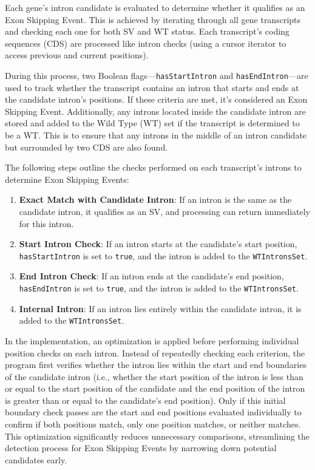 \documentclass{article}
\begin{document}
    Each gene's intron candidate is evaluated to determine whether it qualifies as an Exon Skipping Event. This is achieved by iterating through all gene transcripts and checking each one for both SV and WT status. Each transcript’s coding sequences (CDS) are processed like intron checks (using a cursor iterator to access previous and current positions).

    During this process, two Boolean flags—\texttt{hasStartIntron} and \texttt{hasEndIntron}—are used to track whether the transcript contains an intron that starts and ends at the candidate intron’s positions. If these criteria are met, it’s considered an Exon Skipping Event. Additionally, any introns located inside the candidate intron are stored and added to the Wild Type (WT) set if the transcript is determined to be a WT. This is to ensure that any introns in the middle of an intron candidate but surrounded by two CDS are also found.

    The following steps outline the checks performed on each transcript’s introns to determine Exon Skipping Events:

    \begin{enumerate}
        \item \textbf{Exact Match with Candidate Intron}: If an intron is the same as the candidate intron, it qualifies as an SV, and processing can return immediately for this intron.
        \item \textbf{Start Intron Check}: If an intron starts at the candidate’s start position, \texttt{hasStartIntron} is set to \texttt{true}, and the intron is added to the \texttt{WTIntronsSet}.
        \item \textbf{End Intron Check}: If an intron ends at the candidate’s end position, \texttt{hasEndIntron} is set to \texttt{true}, and the intron is added to the \texttt{WTIntronsSet}.
        \item \textbf{Internal Intron}: If an intron lies entirely within the candidate intron, it is added to the \texttt{WTIntronsSet}.
    \end{enumerate}
    In the implementation, an optimization is applied before performing individual position checks on each intron. Instead of repeatedly checking each criterion, the program first verifies whether the intron lies within the start and end boundaries of the candidate intron (i.e., whether the start position of the intron is less than or equal to the start position of the candidate and the end position of the intron is greater than or equal to the candidate’s end position). Only if this initial boundary check passes are the start and end positions evaluated individually to confirm if both positions match, only one position matches, or neither matches. This optimization significantly reduces unnecessary comparisons, streamlining the detection process for Exon Skipping Events by narrowing down potential candidates early.
\end{document}
